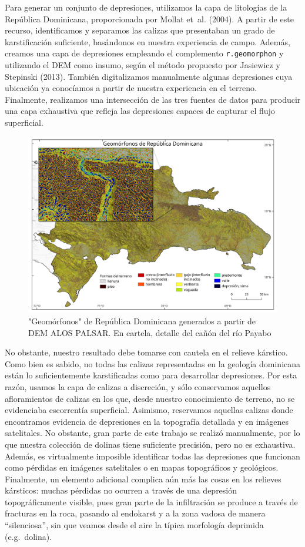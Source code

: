\documentclass[spanish]{article}
\begin{document}
Para generar un conjunto de depresiones, utilizamos la capa de
litologías de la República Dominicana, proporcionada por Mollat et~al.
(2004). A partir de este recurso, identificamos y separamos las calizas
que presentaban un grado de karstificación suficiente, basándonos en
nuestra experiencia de campo. Además, creamos una capa de depresiones
empleando el complemento \texttt{r.geomorphon} y utilizando el DEM como
insumo, según el método propuesto por Jasiewicz y Stepinski (2013).
También digitalizamos manualmente algunas depresiones cuya ubicación ya
conocíamos a partir de nuestra experiencia en el terreno. Finalmente,
realizamos una intersección de las tres fuentes de datos para producir
una capa exhaustiva que refleja las depresiones capaces de capturar el
flujo superficial.

\begin{figure}

{\centering \includegraphics[width=0.8\linewidth]{figuras/geomorfonos-de-rd} 

}

\caption{"Geomórfonos" de República Dominicana generados a partir de DEM ALOS PALSAR. En cartela, detalle del cañón del río Payabo}\label{fig:geomorfonosrd}
\end{figure}

No obstante, nuestro resultado debe tomarse con cautela en el relieve
kárstico. Como bien es sabido, no todas las calizas representadas en la
geología dominicana están lo suficientemente karstificadas como para
desarrollar depresiones. Por esta razón, usamos la capa de calizas a
discreción, y sólo conservamos aquellos afloramientos de calizas en los
que, desde nuestro conocimiento de terreno, no se evidenciaba
escorrentía superficial. Asimismo, reservamos aquellas calizas donde
encontramos evidencia de depresiones en la topografía detallada y en
imágenes satelitales. No obstante, gran parte de este trabajo se realizó
manualmente, por lo que nuestra colección de dolinas tiene suficiente
precisión, pero no es exhaustiva. Además, es virtualmente imposible
identificar todas las depresiones que funcionan como pérdidas en
imágenes satelitales o en mapas topográficos y geológicos. Finalmente,
un elemento adicional complica aún más las cosas en los relieves
kársticos: muchas pérdidas no ocurren a través de una depresión
topográficamente visible, pues gran parte de la infiltración se produce
a través de fracturas en la roca, pasando al endokarst y a la zona
vadosa de manera ``silenciosa'', sin que veamos desde el aire la típica
morfología deprimida (e.g.~dolina).
\end{document}
